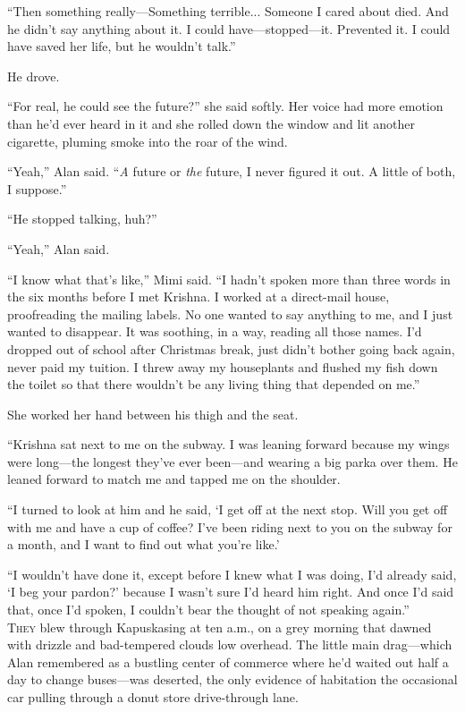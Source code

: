 \documentclass{article}
\begin{document}
``Then something really---Something terrible...  Someone I cared about
died.  And he didn't say anything about it.  I could
have---stopped---it.  Prevented it.  I could have saved her life, but
he wouldn't talk.''

He drove.

``For real, he could see the future?'' she said softly.  Her voice had
more emotion than he'd ever heard in it and she rolled down the window
and lit another cigarette, pluming smoke into the roar of the wind.

``Yeah,'' Alan said.  ``\textit{A} future or \textit{the} future, I
never figured it out.  A little of both, I suppose.''

``He stopped talking, huh?''

``Yeah,'' Alan said.

``I know what that's like,'' Mimi said.  ``I hadn't spoken more than
three words in the six months before I met Krishna.  I worked at a
direct-mail house, proofreading the mailing labels.  No one wanted to
say anything to me, and I just wanted to disappear.  It was soothing,
in a way, reading all those names.  I'd dropped out of school after
Christmas break, just didn't bother going back again, never paid my
tuition.  I threw away my houseplants and flushed my fish down the
toilet so that there wouldn't be any living thing that depended on
me.''

She worked her hand between his thigh and the seat.

``Krishna sat next to me on the subway.  I was leaning forward because
my wings were long---the longest they've ever been---and wearing a big
parka over them.  He leaned forward to match me and tapped me on the
shoulder.

``I turned to look at him and he said, `I get off at the next stop. 
Will you get off with me and have a cup of coffee?  I've been riding
next to you on the subway for a month, and I want to find out what
you're like.'

``I wouldn't have done it, except before I knew what I was doing, I'd
already said, `I beg your pardon?' because I wasn't sure I'd heard him
right.  And once I'd said that, once I'd spoken, I couldn't bear the
thought of not speaking again.''
\\
\lettrine[lines=3, lhang=.5, nindent=0pt, findent=2pt]{T}{hey} blew through Kapuskasing at ten a.m., on a grey morning that
dawned with drizzle and bad-tempered clouds low overhead.  The little
main drag---which Alan remembered as a bustling center of commerce
where he'd waited out half a day to change buses---was deserted, the
only evidence of habitation the occasional car pulling through a donut
store drive-through lane.
\end{document}
